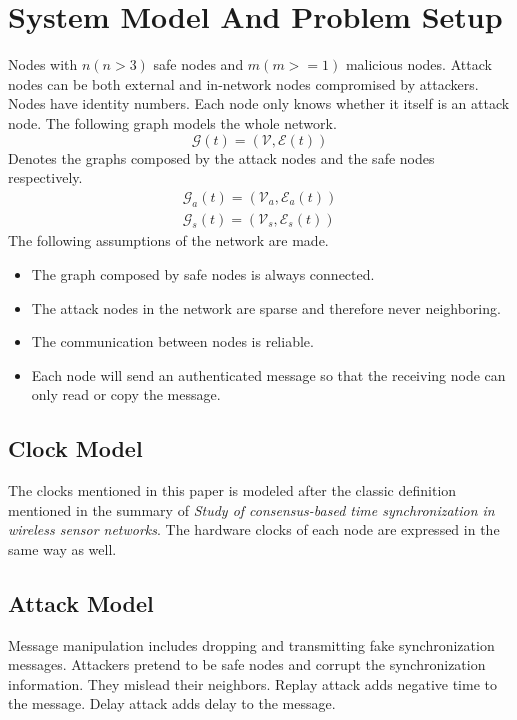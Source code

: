 \documentclass{article}
\begin{document}
\section{System Model And Problem Setup}
Nodes with $n(n > 3)$ safe nodes and $m(m >= 1)$ malicious nodes. Attack nodes can be both external and in-network nodes compromised by attackers. Nodes have identity numbers. Each node only knows whether it itself is an attack node. The following graph models the whole network.
\begin{equation}
    \mathcal{G}(t) = (\mathcal{V}, \mathcal{E}(t)) \nonumber
\end{equation}
Denotes the graphs composed by the attack nodes and the safe nodes respectively.
\begin{align}
    \mathcal{G}_a(t) = (\mathcal{V}_a, \mathcal{E}_a(t)) \nonumber\\
    \mathcal{G}_s(t) = (\mathcal{V}_s, \mathcal{E}_s(t)) \nonumber
\end{align}
The following assumptions of the network are made.
\begin{itemize}
    \item The graph composed by safe nodes is always connected.
    \item The attack nodes in the network are sparse and therefore never neighboring.
    \item The communication between nodes is reliable.
    \item Each node will send an authenticated message so that the receiving node can only read or copy the message.
\end{itemize}

\subsection{Clock Model}
The clocks mentioned in this paper is modeled after the classic definition mentioned in the summary of \textit{Study of consensus-based time synchronization in wireless sensor networks}. The hardware clocks of each node are expressed in the same way as well.

\subsection{Attack Model}
Message manipulation includes dropping and transmitting fake synchronization messages. Attackers pretend to be safe nodes and corrupt the synchronization information. They mislead their neighbors. Replay attack adds negative time to the message. Delay attack adds delay to the message. 
\end{document}

